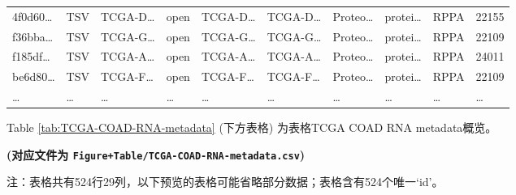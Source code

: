 \documentclass[
]{article}
\begin{document}
\begin{longtable}[]{@{}llllllllll@{}}
4f0d60\ldots{} & TSV & TCGA-D\ldots{} & open & TCGA-D\ldots{} & TCGA-D\ldots{} & Proteo\ldots{} & protei\ldots{} & RPPA & 22155\tabularnewline
f36bba\ldots{} & TSV & TCGA-G\ldots{} & open & TCGA-G\ldots{} & TCGA-G\ldots{} & Proteo\ldots{} & protei\ldots{} & RPPA & 22109\tabularnewline
f185df\ldots{} & TSV & TCGA-A\ldots{} & open & TCGA-A\ldots{} & TCGA-A\ldots{} & Proteo\ldots{} & protei\ldots{} & RPPA & 24011\tabularnewline
be6d80\ldots{} & TSV & TCGA-F\ldots{} & open & TCGA-F\ldots{} & TCGA-F\ldots{} & Proteo\ldots{} & protei\ldots{} & RPPA & 22109\tabularnewline
\ldots{} & \ldots{} & \ldots{} & \ldots{} & \ldots{} & \ldots{} & \ldots{} & \ldots{} & \ldots{} & \ldots{}\tabularnewline
\bottomrule
\end{longtable}

Table \ref{tab:TCGA-COAD-RNA-metadata} (下方表格) 为表格TCGA COAD RNA metadata概览。

\textbf{(对应文件为 \texttt{Figure+Table/TCGA-COAD-RNA-metadata.csv})}

\begin{center}\begin{tcolorbox}[colback=gray!10, colframe=gray!50, width=0.9\linewidth, arc=1mm, boxrule=0.5pt]注：表格共有524行29列，以下预览的表格可能省略部分数据；表格含有524个唯一`id'。
\end{tcolorbox}
\end{center}
\end{document}
